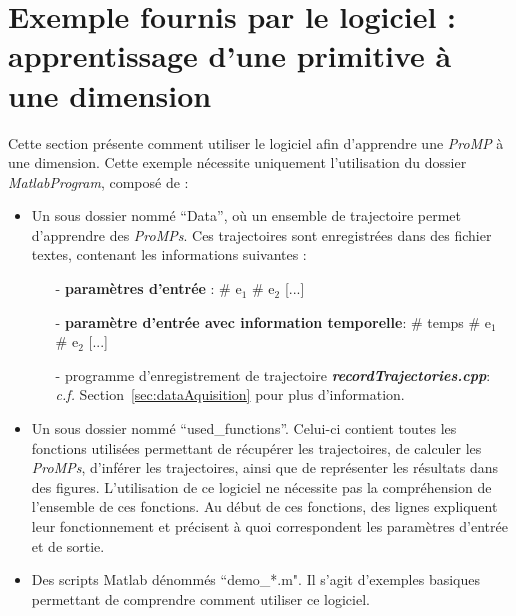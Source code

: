\documentclass[utf8]{frontiersSCNS} %
\begin{document}
\section{Exemple fournis par le logiciel : apprentissage d'une primitive à une dimension}
\label{sec:example1DOF}
Cette section présente comment utiliser le logiciel afin d'apprendre une \textit{ProMP} à une dimension. Cette exemple nécessite uniquement l’utilisation du dossier \textit{MatlabProgram}, composé de :
\begin{itemize}
\item Un sous dossier nommé  ``Data'', où un ensemble de trajectoire permet d'apprendre des \textit{ProMPs}. Ces trajectoires sont enregistrées dans des fichier textes, contenant les informations suivantes :
\begin{itemize}
\item [-] \textbf{paramètres d'entrée }: \# e$_1$ \# e$_2$ [...]
\item [-] \textbf{paramètre d'entrée avec information temporelle}: \# temps \# e$_1$ \# e$_2$ [...]
\item [-] programme d'enregistrement de trajectoire \textbf{\textit{recordTrajectories.cpp}}: \textit{c.f.} Section~\ref{sec:dataAquisition} pour plus d'information.
\end{itemize}
\item Un sous dossier nommé ``used\_functions''. Celui-ci contient toutes les fonctions utilisées permettant de récupérer les trajectoires, de calculer les \textit{ProMPs}, d'inférer les trajectoires, ainsi que de représenter les résultats dans des figures. L'utilisation de ce logiciel ne nécessite pas la compréhension de l'ensemble de ces fonctions. 
Au début de ces fonctions, des lignes expliquent leur fonctionnement et précisent à quoi correspondent les paramètres d'entrée et de sortie.
\item Des scripts Matlab dénommés ``demo\_*.m". Il s'agit d'exemples basiques permettant de comprendre comment utiliser ce logiciel.
\end{itemize}
\end{document}
